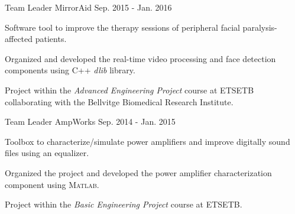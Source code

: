 
\begin{cventries}

\cventry
  {Team Leader}
  {MirrorAid}
  {}
  {Sep. 2015 - Jan. 2016}
  {
    \begin{cvitems}
      \item {Software tool to improve the therapy sessions of peripheral facial paralysis-affected patients.}
      \item {Organized and developed the real-time video processing and face detection components using C++ \textit{dlib} library.}
      \item {Project within the \textit{Advanced Engineering Project} course at ETSETB collaborating with the Bellvitge Biomedical Research Institute.}
    \end{cvitems}
  }

\cventry
  {Team Leader}
  {AmpWorks}
  {}
  {Sep. 2014 - Jan. 2015}
  {
    \begin{cvitems}
      \item {Toolbox to characterize/simulate power amplifiers and improve digitally sound files using an equalizer.}
      \item {Organized the project and developed the power amplifier characterization component using \textsc{Matlab}.}
      \item {Project within the \textit{Basic Engineering Project} course at ETSETB.}
    \end{cvitems}
  }

\end{cventries}
